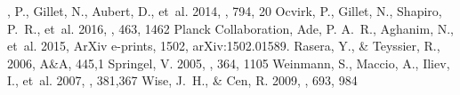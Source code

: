\documentclass[twocolumn]{aastex61}
\begin{document}
\begin{thebibliography}{}
, P., {Gillet}, N., {Aubert}, D., {et~al.} 2014, \apj, 794, 20
 {Ocvirk}, P., {Gillet}, N., {Shapiro}, P.~R., {et~al.} 2016, \mnras, 463, 1462
 {Planck Collaboration}, Ade, P. A.~R., Aghanim, N., {et~al.} 2015, ArXiv e-prints, 1502, arXiv:1502.01589.
 {Rasera}, Y., \& {Teyssier}, R., 2006, A\&A, 445,1
 {Springel}, V. 2005, \mnras, 364, 1105
 {Weinmann}, S., {Maccio}, A., {Iliev}, I., {et~al.} 2007, \mnras, 381,367
 {Wise}, J.~H., \& {Cen}, R. 2009, \apj, 693, 984


\end{thebibliography}


\end{document}
